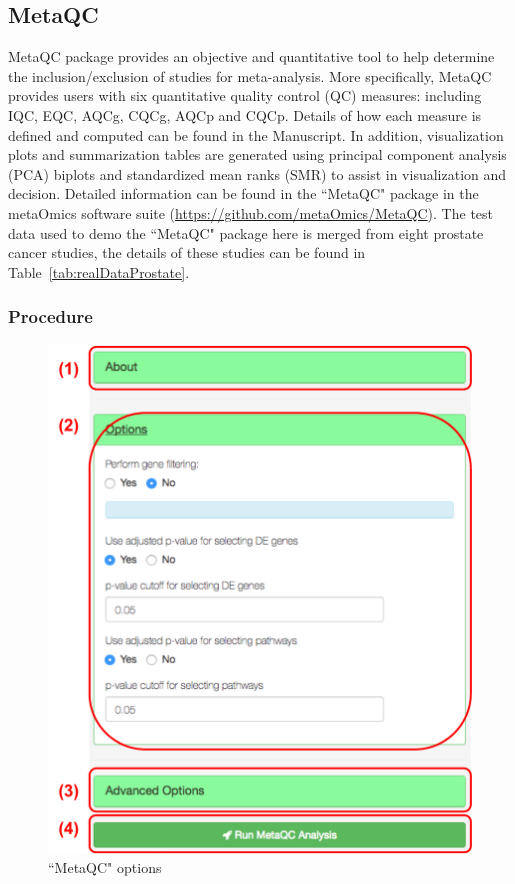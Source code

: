 \subsection{MetaQC}
MetaQC package provides an objective and quantitative tool to help determine the inclusion/exclusion of studies for meta-analysis. More specifically, MetaQC provides users with six quantitative quality control (QC) measures: including IQC, EQC, AQCg, CQCg, AQCp and CQCp. Details of how each measure is defined and computed can be found in the Manuscript. In addition, visualization plots and summarization tables are generated using principal component analysis (PCA) biplots and standardized mean ranks (SMR) to assist in visualization and decision. Detailed information can be found in the ``MetaQC" package in the metaOmics software suite (\url{https://github.com/metaOmics/MetaQC}). The test data used to demo the ``MetaQC" package here is merged from eight prostate cancer studies, the details of these studies can be found in Table~\ref{tab:realDataProstate}. 

\subsubsection{Procedure}

\begin{figure}[H]
\begin{center}
\includegraphics[scale=0.4]{./figure/metaQC/metaQCoption.pdf}
\caption{``MetaQC" options}
\label{fig:MetaQCoption}
\end{center}
\end{figure}

